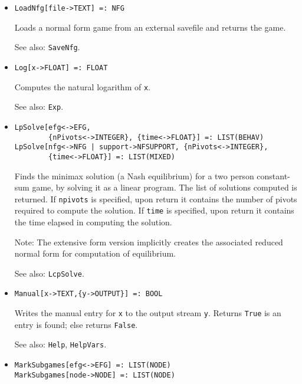 \begin{itemize}
\item
\protect \large \begin{verbatim}
LoadNfg[file->TEXT] =: NFG
\end{verbatim}\normalsize

\bd
Loads a normal form game from an external savefile
and returns the game.  
\item
[See also:] {\tt SaveNfg}.
\ed

\item
\protect \large \begin{verbatim}
Log[x->FLOAT] =: FLOAT
\end{verbatim} \normalsize

\bd
Computes the natural logarithm of \verb+x+.
\item
[See also:] {\tt Exp}.
\ed

\item
\protect \large \begin{verbatim}
LpSolve[efg<->EFG,
        {nPivots<->INTEGER}, {time<->FLOAT}] =: LIST(BEHAV)
LpSolve[nfg<->NFG | support->NFSUPPORT, {nPivots<->INTEGER},
        {time<->FLOAT}] =: LIST(MIXED)
\end{verbatim}\normalsize

\bd
Finds the minimax solution (a Nash equilibrium) for a
two person constant-sum game, by solving it as a linear program.
The list of solutions computed is returned.  If \verb+npivots+ is
specified, upon return it contains the number of pivots required to
compute the solution.  If \verb+time+ is specified, upon return it
contains the time elapsed in computing the solution.
\item
[Note:] The extensive form version implicitly creates the associated
reduced normal form for computation of equilibrium.
\item
[See also:] {\tt LcpSolve}.
\ed


\item
\protect \large \begin{verbatim}
Manual[x->TEXT,{y->OUTPUT}] =: BOOL
\end{verbatim} \normalsize

\bd Writes the manual entry for \verb+x+ to the output stream
\verb+y+.  Returns \verb+True+ is an entry is found; else returns
\verb+False+.
\item
[See also:] {\tt Help}, {\tt HelpVars}.
\ed

\item
\protect \large \begin{verbatim}
MarkSubgames[efg<->EFG] =: LIST(NODE)
MarkSubgames[node->NODE] =: LIST(NODE)
\end{verbatim} \normalsize


\end{itemize}
